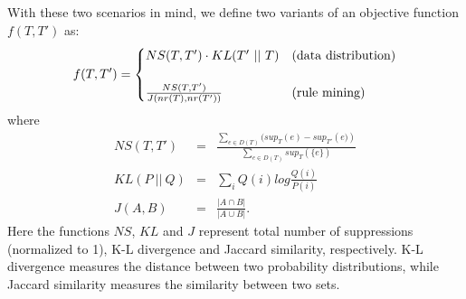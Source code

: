 With these two scenarios in mind, we define two variants of an objective function $f(T, T')$ as:
\begin{equation}
f(T, T') =
\begin{cases}
NS(T, T')\cdot KL(T'~||~T) & \rm{(data~ distribution)} \\
& \\
\frac{NS(T, T')}{J(nr(T), nr(T'))} & \rm{(rule~ mining)}
\end{cases}
\end{equation}
where
\begin{eqnarray}
NS(T,T') &=& \frac{\sum_{e\in D(T)}(sup_T({e}) - sup_{T'}({{e})})}{\sum_{e\in D(T)}sup_{T}(\{e\})} \\
KL(P~||~Q)&=&\sum_{i}Q(i)log\frac{Q(i)}{P(i)} \label{eq:kl}\\
J(A, B) &=& \frac{|A \cap B|}{|A \cup B|}.
\label{eq:kl-dis}
\end{eqnarray}
Here the functions $NS$, $KL$ and $J$ represent total number of suppressions 
(normalized to 1), K-L divergence and Jaccard similarity, respectively. K-L
divergence measures the distance between two probability distributions, while
Jaccard similarity measures the similarity between two sets.
%
%
%



